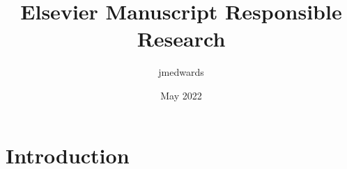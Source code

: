 \documentclass{article}
\title{Elsevier Manuscript Responsible Research}
\author{jmedwards }
\date{May 2022}
\begin{document}
\maketitle

\section{Introduction}
\end{document}
